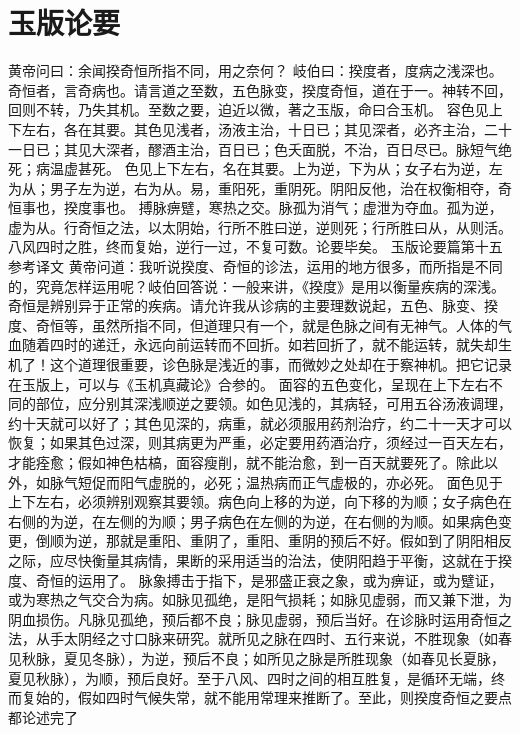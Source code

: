\documentclass[a4paper,12pt,UTF8,twoside]{ctexbook}
\begin{document}
\chapter{玉版论要}
黄帝问曰：余闻揆奇恒所指不同，用之奈何？
岐伯曰：揆度者，度病之浅深也。奇恒者，言奇病也。请言道之至数，五色脉变，揆度奇恒，道在于一。神转不回，回则不转，乃失其机。至数之要，迫近以微，著之玉版，命曰合玉机。
容色见上下左右，各在其要。其色见浅者，汤液主治，十日已；其见深者，必齐主治，二十一日已；其见大深者，醪酒主治，百日已；色夭面脱，不治，百日尽已。脉短气绝死；病温虚甚死。
色见上下左右，名在其要。上为逆，下为从；女子右为逆，左为从；男子左为逆，右为从。易，重阳死，重阴死。阴阳反他，治在权衡相夺，奇恒事也，揆度事也。
搏脉痹躄，寒热之交。脉孤为消气；虚泄为夺血。孤为逆，虚为从。行奇恒之法，以太阴始，行所不胜曰逆，逆则死；行所胜曰从，从则活。八风四时之胜，终而复始，逆行一过，不复可数。论要毕矣。
玉版论要篇第十五参考译文
黄帝问道：我听说揆度、奇恒的诊法，运用的地方很多，而所指是不同的，究竟怎样运用呢？岐伯回答说：一般来讲，《揆度》是用以衡量疾病的深浅。奇恒是辨别异于正常的疾病。请允许我从诊病的主要理数说起，五色、脉变、揆度、奇恒等，虽然所指不同，但道理只有一个，就是色脉之间有无神气。人体的气血随着四时的递迁，永远向前运转而不回折。如若回折了，就不能运转，就失却生机了！这个道理很重要，诊色脉是浅近的事，而微妙之处却在于察神机。把它记录在玉版上，可以与《玉机真藏论》合参的。
面容的五色变化，呈现在上下左右不同的部位，应分别其深浅顺逆之要领。如色见浅的，其病轻，可用五谷汤液调理，约十天就可以好了；其色见深的，病重，就必须服用药剂治疗，约二十一天才可以恢复；如果其色过深，则其病更为严重，必定要用药酒治疗，须经过一百天左右，才能痊愈；假如神色枯槁，面容瘦削，就不能治愈，到一百天就要死了。除此以外，如脉气短促而阳气虚脱的，必死；温热病而正气虚极的，亦必死。
面色见于上下左右，必须辨别观察其要领。病色向上移的为逆，向下移的为顺；女子病色在右侧的为逆，在左侧的为顺；男子病色在左侧的为逆，在右侧的为顺。如果病色变更，倒顺为逆，那就是重阳、重阴了，重阳、重阴的预后不好。假如到了阴阳相反之际，应尽快衡量其病情，果断的采用适当的治法，使阴阳趋于平衡，这就在于揆度、奇恒的运用了。
脉象搏击于指下，是邪盛正衰之象，或为痹证，或为躄证，或为寒热之气交合为病。如脉见孤绝，是阳气损耗；如脉见虚弱，而又兼下泄，为阴血损伤。凡脉见孤绝，预后都不良；脉见虚弱，预后当好。在诊脉时运用奇恒之法，从手太阴经之寸口脉来研究。就所见之脉在四时、五行来说，不胜现象（如春见秋脉，夏见冬脉），为逆，预后不良；如所见之脉是所胜现象（如春见长夏脉，夏见秋脉），为顺，预后良好。至于八风、四时之间的相互胜复，是循环无端，终而复始的，假如四时气候失常，就不能用常理来推断了。至此，则揆度奇恒之要点都论述完了
\end{document}

